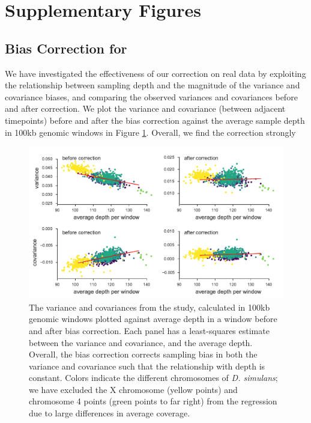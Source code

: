 \documentclass[11pt]{article}
\begin{document}
\section{Supplementary Figures}


\subsection{Bias Correction for \textcite{Barghi2019-qy}}

We have investigated the effectiveness of our correction on real data by
exploiting the relationship between sampling depth and the magnitude of the
variance and covariance biases, and comparing the observed variances and
covariances before and after correction. We plot the variance and covariance
(between adjacent timepoints) before and after the bias correction against the
average sample depth in 100kb genomic windows in Figure
\ref{suppfig:barghi-correction}. Overall, we find the correction strongly

\begin{figure}[!ht]
  \centering
  \includegraphics[]{figures/barghi-correction-plot.pdf}

  \caption{The variance and covariances from the \textcite{Barghi2019-qy}
    study, calculated in 100kb genomic windows plotted against average depth in
    a window before and after bias correction.  Each panel has a least-squares
    estimate between the variance and covariance, and the average depth.
    Overall, the bias correction corrects sampling bias in both the variance
    and covariance such that the relationship with depth is constant. Colors
    indicate the different chromosomes of \emph{D. simulans}; we have excluded
  the X chromosome (yellow points) and chromosome 4 points (green points to far
right) from the regression due to large differences in average coverage.}

  \label{suppfig:barghi-correction}
\end{figure}
\end{document}
